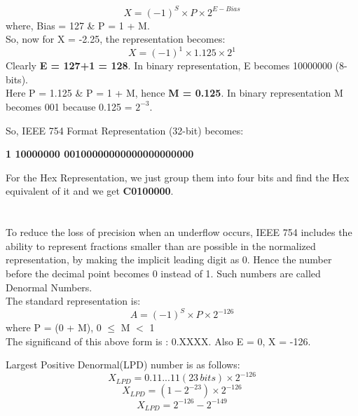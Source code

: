 \documentclass[12pt]{article}
\begin{document}
    \begin{equation*}
        X = (-1)^S \times P \times 2^{E-Bias}
    \end{equation*}
    where, Bias = 127 \& P = 1 + M.\\
    So, now for X = -2.25, the representation becomes: \\
    \begin{equation*}
        X = (-1)^1 \times 1.125 \times 2^{1}
    \end{equation*}
    Clearly \textbf{E = 127+1 = 128}. In binary representation, E becomes 10000000 (8-bits). \\
    Here P = 1.125 \& P = 1 + M, hence \textbf{M = 0.125}. In binary representation M becomes 001 because 0.125 = $2^{-3}$.
    
    So, IEEE 754 Format Representation (32-bit) becomes:
    \begin{center}
        \textbf{1 10000000 00100000000000000000000}    
    \end{center}
    
For the Hex Representation, we just group them into four bits and find the Hex equivalent of it and we get \textbf{C0100000}.

\section{}
    
     To reduce the loss of precision when an underflow occurs, IEEE 754 includes the ability to represent fractions smaller than are possible in the normalized representation, by making the implicit leading digit as 0. Hence the number before the decimal point becomes 0 instead of 1. Such numbers are called Denormal Numbers.\\
    
    The standard representation is:
    \begin{equation*}
        A = (-1)^S \times P \times 2^{-126}
    \end{equation*}
    where P = (0 + M), 0 $\leq$ M $<$ 1 \\

    The significand of this above form is : 0.XXXX. Also E = 0, X = -126.
    
    Largest Positive Denormal(LPD) number is as follows: 
    \begin{equation*}
        X_{LPD} = 0.11...11 (23 \, bits) \times 2^{-126}
    \end{equation*}
    \begin{equation*}
        X_{LPD} = (1-2^{-23}) \times 2^{-126}
    \end{equation*}
    \begin{equation*}
        X_{LPD} = 2^{-126} - 2^{-149}
    \end{equation*}
    
\end{document}
